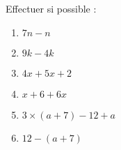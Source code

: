 
\begin{exercice}\label{exosmath-0984}

    Effectuer si possible :
    \begin{multicols}{2}
        \begin{enumerate}
            \item
                \( 7n-n\)
            \item
                \( 9k-4k\)
            \item
                \( 4x+5x+2\)
            \item
                \( x+6+6x\)
            \item
                \( 3\times (a+7)-12+a\)
            \item
                \( 12-(a+7)\)
        \end{enumerate}
    \end{multicols}

\end{exercice}
